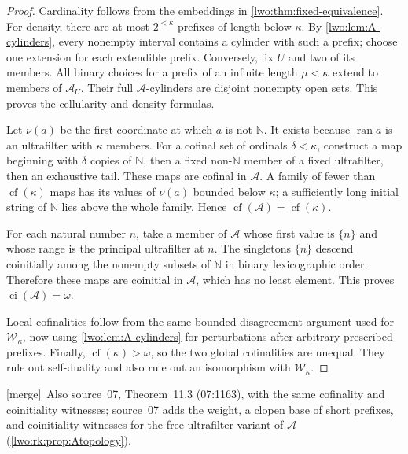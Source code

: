 \documentclass[11pt,a4paper]{article}
\newtheorem{proposition}[theorem]{Proposition}
\theoremstyle{definition}
\theoremstyle{remark}
\newcommand{\N}{\mathbb N}
\newcommand{\W}{\mathcal W}
\newcommand{\A}{\mathcal A}
\newcommand{\ran}{\operatorname{ran}}
\newcommand{\cf}{\operatorname{cf}}
\newcommand{\ci}{\operatorname{ci}}
\newcommand{\dens}{\operatorname{d}}
\newcommand{\cell}{\operatorname{cell}}
\newcommand{\merge}{\textsf{[merge]}}
\begin{document}
\begin{proof}
Cardinality follows from the embeddings in \cref{lwo:thm:fixed-equivalence}.
For density, there are at most $2^{<\kappa}$ prefixes of length below
$\kappa$. By \cref{lwo:lem:A-cylinders}, every nonempty interval contains a
cylinder with such a prefix; choose one extension for each extendible
prefix. Conversely, fix $U$ and two of its members. All binary choices for
a prefix of an infinite length $\mu<\kappa$ extend to members of $\A_U$.
Their full $\A$-cylinders are disjoint nonempty open sets. This proves the
cellularity and density formulas.

Let $\nu(a)$ be the first coordinate at which $a$ is not $\N$. It exists
because $\ran a$ is an ultrafilter with $\kappa$ members. For a cofinal set
of ordinals $\delta<\kappa$, construct a map beginning with $\delta$ copies
of $\N$, then a fixed non-$\N$ member of a fixed ultrafilter, then an
exhaustive tail. These maps are cofinal in $\A$. A family of fewer than
$\cf(\kappa)$ maps has its values of $\nu(a)$ bounded below $\kappa$;
a sufficiently long initial string of $\N$ lies above the whole family.
Hence $\cf(\A)=\cf(\kappa)$.

For each natural number $n$, take a member of $\A$ whose first value is
$\{n\}$ and whose range is the principal ultrafilter at $n$. The singletons
$\{n\}$ descend coinitially among the nonempty subsets of $\N$ in binary
lexicographic order. Therefore these maps are coinitial in $\A$, which has
no least element. This proves $\ci(\A)=\omega$.

Local cofinalities follow from the same bounded-disagreement argument used
for $\W_\kappa$, now using \cref{lwo:lem:A-cylinders} for perturbations after
arbitrary prescribed prefixes. Finally, $\cf(\kappa)>\omega$, so the two
global cofinalities are unequal. They rule out self-duality and also rule
out an isomorphism with $\W_\kappa$.
\end{proof}
\merge\ Also source~07, Theorem~11.3 (07:1163), with the same
cofinality and coinitiality witnesses; source~07 adds the weight, a clopen base
of short prefixes, and coinitiality witnesses for the free-ultrafilter
variant of $\A$ (\cref{lwo:rk:prop:Atopology}).
\end{document}
